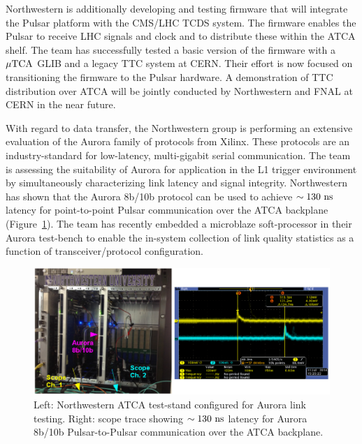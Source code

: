 Northwestern is additionally developing and testing firmware that will integrate the Pulsar platform with the CMS/LHC TCDS system.  The firmware enables the Pulsar to receive LHC signals and clock and to distribute these within the ATCA shelf.  The team has successfully tested a basic version of the firmware with a $\mu\rm TCA$ GLIB and a legacy TTC system at CERN.  Their effort is now focused on transitioning the firmware to the Pulsar hardware.  A demonstration of TTC distribution over ATCA will be jointly conducted by Northwestern and FNAL at CERN in the near future.

With regard to data transfer, the Northwestern group is performing an extensive evaluation of the Aurora family of protocols from Xilinx.  These protocols are an industry-standard for low-latency, multi-gigabit serial communication.  The team is assessing the suitability of Aurora for application in the L1 trigger environment by simultaneously characterizing link latency and signal integrity.  Northwestern has shown that the Aurora 8b/10b protocol can be used to achieve $\sim130\rm~ns$ latency for point-to-point Pulsar communication over the ATCA backplane (Figure~\ref{fig:scope}).  The team has recently embedded a microblaze soft-processor in their Aurora test-bench to enable the in-system collection of link quality statistics as a function of transceiver/protocol configuration.


\begin{figure}[h]
\begin{center}
\includegraphics[width=0.80\linewidth]{Plots/crate_and_scope.png}
\caption{Left: Northwestern ATCA test-stand configured for Aurora link testing.  Right: scope trace showing $\sim 130\rm~ns$ latency for Aurora 8b/10b Pulsar-to-Pulsar communication over the ATCA backplane.}
\label{fig:scope}
\end{center}
\end{figure}

